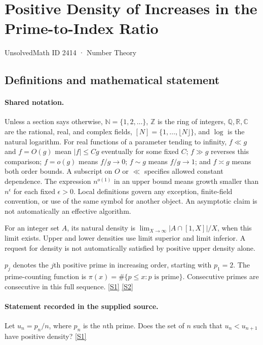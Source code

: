 \documentclass[11pt,a4paper]{article}
\newcommand{\N}{\mathbb{N}}
\newcommand{\Z}{\mathbb{Z}}
\newcommand{\Q}{\mathbb{Q}}
\newcommand{\R}{\mathbb{R}}
\newcommand{\C}{\mathbb{C}}
\newcommand{\sref}[2]{\hyperlink{source:#1:#2}{[S#2]}}
\begin{document}

\setcounter{section}{2413}

\section{Positive Density of Increases in the Prime-to-Index Ratio}\label{2414}

{\small\sffamily UnsolvedMath ID 2414 · Number Theory}

\subsection{Definitions and mathematical statement}

\paragraph{Shared notation.}Unless a section says otherwise, $\N=\{1,2,\ldots\}$,
$\Z$ is the ring of integers, $\Q,\R,\C$ are the rational, real, and complex
fields, $[N]=\{1,\ldots,\lfloor N\rfloor\}$, and $\log$ is the natural
logarithm. For real functions of a parameter tending to infinity,
$f\ll g$ and $f=O(g)$ mean $|f|\leq Cg$ eventually for some fixed $C$;
$f\gg g$ reverses this comparison; $f=o(g)$ means $f/g\to0$;
$f\sim g$ means $f/g\to1$; and $f\asymp g$ means both order bounds.
A subscript on $O$ or $\ll$ specifies allowed constant dependence.
The expression $n^{o(1)}$ in an upper bound means growth smaller than
$n^\epsilon$ for each fixed $\epsilon>0$. Local definitions govern any
exception, finite-field convention, or use of the same symbol for another
object. An asymptotic claim is not automatically an effective algorithm.



For an integer set $A$, its natural density is $\lim_{X\to\infty}|A\cap[1,X]|/X$, when this limit exists. Upper and lower densities use limit superior and limit inferior. A request for density is not automatically satisfied by positive upper density alone.

$p_j$ denotes the $j$th positive prime in increasing order, starting with $p_1=2$. The prime-counting function is $\pi(x)=\#\{p\leq x:p\text{ is prime}\}$. Consecutive primes are consecutive in this full sequence. \sref{2414}{1} \sref{2414}{2}

\paragraph{Statement recorded in the supplied source.}
Let $u_n=p_n/n$, where $p_n$ is the $n$th prime. Does the set of $n$ such that $u_n<u_{n+1}$ have positive density? \sref{2414}{1}
\end{document}
